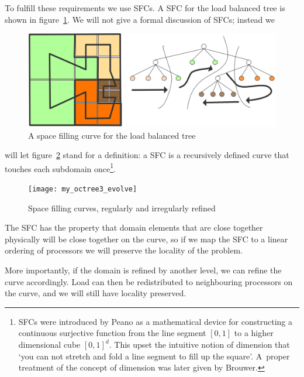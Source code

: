 To fulfill these requirements we use \acfp{SFC}. A \acf{SFC} for the
load balanced tree is shown in figure~\ref{fig:octree-sfc}. We will
not give a formal discussion of \acp{SFC}; instead we
\begin{figure}[ht]
  \includegraphics[scale=.18]{graphics/my_octree3}
  \caption{A space filling curve for the load balanced tree}
  \label{fig:octree-sfc}
\end{figure}
will let figure~\ref{fig:octree3} stand for a definition: a \ac{SFC} is a
recursively defined curve that touches each subdomain
once\footnote{\acfp{SFC} were introduced by Peano as a mathematical
  device for constructing a continuous surjective function from the
  line segment $[0,1]$ to a higher dimensional cube $[0,1]^d$. This
  upset the intuitive notion of dimension that `you can not stretch
  and fold a line segment to fill up the square'. A~proper treatment
  of the concept of dimension was later given by Brouwer.}.
\begin{figure}[ht]
  \texttt{[image: my\_octree3\_evolve]}
  \caption{Space filling curves, regularly and irregularly refined}
  \label{fig:octree3}
\end{figure}
The \ac{SFC} has the property that domain elements that are close
together physically will be close together on the curve, so if we map
the \ac{SFC} to a linear ordering of processors we will preserve the
locality of the problem. 

More importantly, if the domain is refined by
another level, we can refine the curve accordingly. Load can then be
redistributed to neighbouring processors on the curve, and we will
still have locality preserved.


\endinput
\Level 2 {Task migration}

An extreme case of load balancing is \indexterm{task migration}, where
a whole process is moved between processors.


